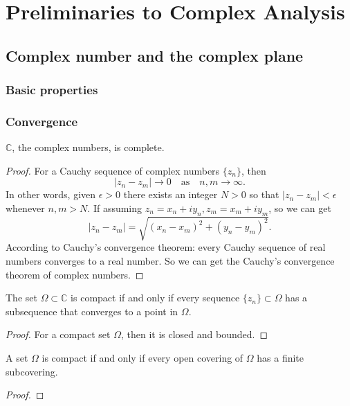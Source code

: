 \chapter{Preliminaries to Complex Analysis}

\section{Complex number and the complex plane}

\subsection{Basic properties}


\subsection{Convergence}

\begin{theorem}
    $\mathbb{C}$, the complex numbers, is complete.
\end{theorem}
\begin{proof}
    For a Cauchy sequence of complex numbers $\{z_n\}$, then
    \[
        |z_n-z_m|\to 0 \quad\text{as}\quad n,m\to\infty.
    \]
    In other words, given $\epsilon>0$ there exists an
    integer $N>0$ so that $|z_n-z_m|<\epsilon$ whenever $n,m>N$.
    If assuming $z_n=x_n+iy_n, z_m=x_m+iy_m$, so we can get
    \[
        |z_n-z_m|=\sqrt{(x_n-x_m)^2+(y_n-y_m)^2}.
    \]
    According to Cauchy's convergence theorem: every Cauchy sequence
    of real numbers converges to a real number. So we can get the Cauchy's
    convergence theorem of complex numbers.
\end{proof}

\begin{theorem}
    The set $\Omega\subset \mathbb{C}$ is compact if and only if every sequence
    $\{z_n\}\subset \Omega$ has a subsequence that converges to a point in $\Omega$.
\end{theorem}
\begin{proof}
	For a compact set $\Omega$, then it is closed and bounded.
\end{proof}

\begin{theorem}
    A set $\Omega$ is compact if and only if every open covering of
    $\Omega$ has a finite subcovering.
\end{theorem}
\begin{proof}
\end{proof}

